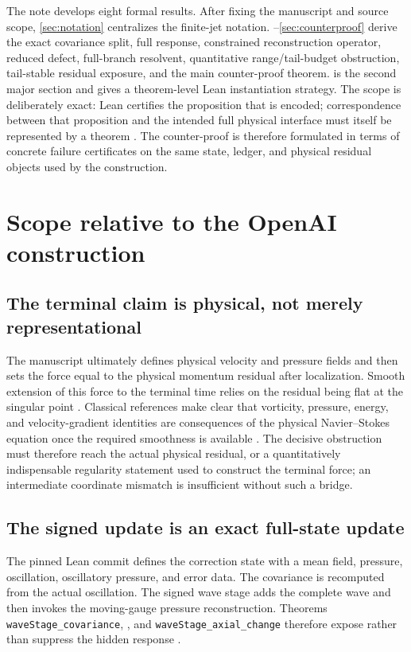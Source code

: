 \documentclass[12pt]{article}
\theoremstyle{plain}
\theoremstyle{definition}
\theoremstyle{remark}
\begin{document}
The note develops eight formal results. After fixing the manuscript and source scope, \cref{sec:notation} centralizes the finite-jet notation. --\ref{sec:counterproof} derive the exact covariance split, full response, constrained reconstruction operator, reduced defect, full-branch resolvent, quantitative range/tail-budget obstruction, tail-stable residual exposure, and the main counter-proof theorem.  is the second major section and gives a theorem-level Lean instantiation strategy. The scope is deliberately exact: Lean certifies the proposition that is encoded; correspondence between that proposition and the intended full physical interface must itself be represented by a theorem \cite{deMouraEtAl2015,Lean4TPIL,Lean4Reference}. The counter-proof is therefore formulated in terms of concrete failure certificates on the same state, ledger, and physical residual objects used by the construction.

\section{Scope relative to the OpenAI construction}\label{sec:scope}
\subsection{The terminal claim is physical, not merely representational}
The manuscript ultimately defines physical velocity and pressure fields and then sets the force equal to the physical momentum residual after localization. Smooth extension of this force to the terminal time relies on the residual being flat at the singular point \cite[Secs.~9--10]{OpenAI2026}. Classical references make clear that vorticity, pressure, energy, and velocity-gradient identities are consequences of the physical Navier--Stokes equation once the required smoothness is available \cite{MajdaBertozzi2002,RobinsonRodrigoSadowski2016}. The decisive obstruction must therefore reach the actual physical residual, or a quantitatively indispensable regularity statement used to construct the terminal force; an intermediate coordinate mismatch is insufficient without such a bridge.

\subsection{The signed update is an exact full-state update}
The pinned Lean commit defines the correction state with a mean field, pressure, oscillation, oscillatory pressure, and error data. The covariance is recomputed from the actual oscillation. The signed wave stage adds the complete wave and then invokes the moving-gauge pressure reconstruction. Theorems \texttt{waveStage\_covariance}, , and \texttt{waveStage\_axial\_change} therefore expose rather than suppress the hidden response \cite{OpenAILeanRepo2026}.
\end{document}
